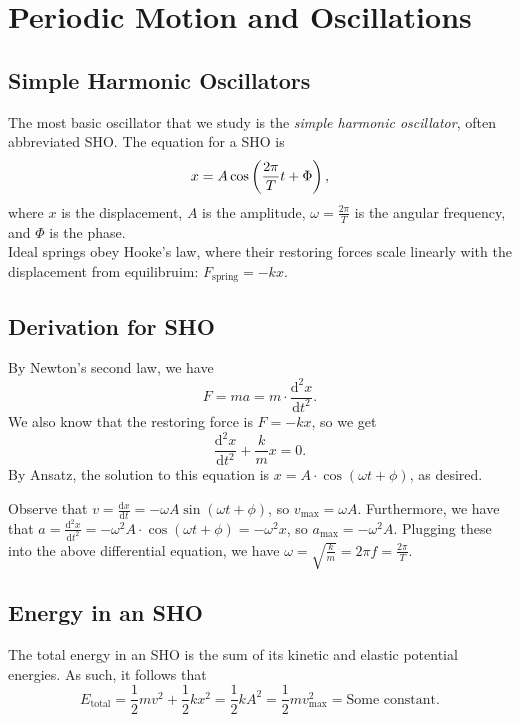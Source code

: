\documentclass[class=article, crop=false]{standalone}
\begin{document}
  \section{Periodic Motion and Oscillations}
  \subsection{Simple Harmonic Oscillators}
  The most basic oscillator that we study is the \emph{simple harmonic oscillator}, often abbreviated SHO. The equation for a SHO is
  \[
    x = A\cos \left( \frac{2\pi}{T}t + \Phi \right),
  \]
  where $x$ is the displacement, $A$ is the amplitude, $\omega=\frac{2\pi}{T}$ is the angular frequency, and $\Phi$ is the phase. \\[10pt]
  Ideal springs obey Hooke's law, where their restoring forces scale linearly with the displacement from equilibruim: $F_{\text{spring}} = -kx$.
  \subsection{Derivation for SHO}
  By Newton's second law, we have 
  \[
    F = ma = m\cdot \frac{\mathrm{d}^2x}{\mathrm{d}t^2}.
  \]
  We also know that the restoring force is $F=-kx$, so we get
  \[
    \frac{\mathrm{d}^2x}{\mathrm{d}t^2} + \frac{k}{m}x = 0.
  \]
  By Ansatz, the solution to this equation is $x = A\cdot\cos(\omega t + \phi)$, as desired.
  \begin{note}{}
    Observe that $v = \frac{\mathrm{d}x}{\mathrm{d}t} = -\omega A\sin (\omega t + \phi)$, so $v_{\text{max}} = \omega A$. Furthermore, we have that $a = \frac{\mathrm{d}^2x}{\mathrm{d}t^2} = -\omega^2A \cdot\cos(\omega t + \phi) = -\omega^2 x$, so $a_{\text{max}} = -\omega^2A$. Plugging these into the above differential equation, we have $\omega = \sqrt{\frac{k}{m}} = 2\pi f = \frac{2\pi}{T}$.
  \end{note}
  \subsection{Energy in an SHO}
  The total energy in an SHO is the sum of its kinetic and elastic potential energies. As such, it follows that
  \[
    E_{\text{total}} = \frac{1}{2}mv^2+\frac{1}{2}kx^2 = \frac{1}{2}kA^2 = \frac{1}{2}mv_{\text{max}}^2 = \text{Some constant}.
  \]
\end{document}
